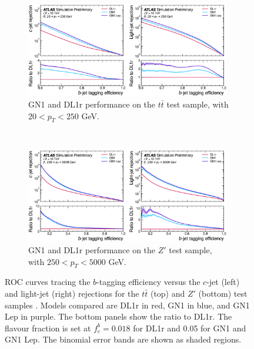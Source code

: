 \begin{figure}[h!]
  \centering
  \begin{subfigure}[b]{0.98\textwidth}
      \centering
      \includegraphics[width=0.98\textwidth]{Images/FTAG/GN/GN1/ROC/ttb.png}
      \caption{GN1 and DL1r performance on the $t\bar{t}$ test sample, with $20 < p_T < 250$ GeV.} 
      \label{fig:GN1ttb}
  \end{subfigure}\\
  \begin{subfigure}[b]{0.98\textwidth}
    \centering %
      \includegraphics[width=0.98\textwidth]{Images/FTAG/GN/GN1/ROC/zpb.png}
      \caption{GN1 and DL1r performance on the $Z'$ test sample, with $250 < p_T < 5000$ GeV.} 
      \label{fig:GN1zpb}
  \end{subfigure}
  \caption{ROC curves tracing the $b$-tagging efficiency versus the $c$-jet (left) and light-jet (right) rejections for the $t\bar{t}$ (top) and $Z'$ (bottom) test samples \cite{ATL-PHYS-PUB-2022-027}. Models compared are DL1r in red, GN1 in blue, and GN1 Lep in purple. The bottom panels show the ratio to DL1r. The flavour fraction is set at $f^b_c = 0.018$ for DL1r and 0.05 for GN1 and GN1 Lep. The binomial error bands are shown as shaded regions.}
  \label{fig:GN1rocb}
\end{figure} 

